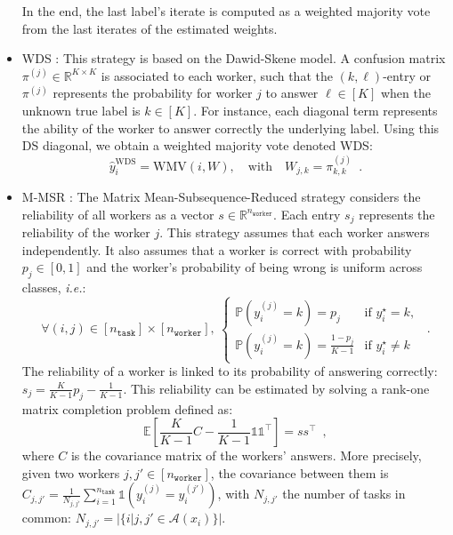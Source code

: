 \documentclass{cap2024}
\begin{document}
\begin{itemize}
    In the end, the last label's iterate is computed as a weighted majority vote from the last iterates of the estimated weights.

    \item WDS \citep{dawid_maximum_1979}:
    This strategy is based on the Dawid-Skene model. A confusion matrix $\pi^{(j)}\in\mathbb{R}^{K\times K}$ is associated to each worker, such that the $(k,\ell)$-entry or $\pi^{(j)}$ represents the probability for worker $j$ to answer $\ell\in[K]$ when the unknown true label is $k\in[K]$. For instance, each diagonal term represents the ability of the worker to answer correctly the underlying label.
  Using this DS diagonal, we obtain a weighted majority vote denoted WDS:
  \begin{equation}
    \hat{y}_i^\text{WDS}= \mathrm{WMV}\left(i, W\right),\quad
    \text{with}\quad W_{j,k} = \pi^{(j)}_{k,k}\enspace.
  \end{equation}
  \item M-MSR \citep{ma2020adversarial}: The Matrix Mean-Subsequence-Reduced strategy considers the reliability of all workers as a vector $s\in\mathbb{R}^{n_\texttt{worker}}$. Each entry $s_j$ represents the reliability of the worker $j$.
  This strategy assumes that each worker answers independently. It also assumes that a worker is correct with probability $p_j\in[0,1]$ and the worker's probability of being wrong is uniform across classes, \emph{i.e.}:
  \[\forall (i,j)\in [n_\texttt{task}]\times [n_\texttt{worker}],\ \begin{cases} \mathbb{P}(y_i^{(j)}=k)=p_j & \text{if } y_i^\star=k, \\ \mathbb{P}(y_i^{(j)}=k)=\frac{1-p_j}{K-1} & \text{if } y_i^\star\neq k\end{cases} \enspace.\]
  The reliability of a worker is linked to its probability of answering correctly: $s_j = \frac{K}{K-1}p_j - \frac{1}{K-1}$.
  This reliability can be estimated by solving a rank-one matrix completion problem defined as:
  \[\mathbb{E}\left[\frac{K}{K-1}C - \frac{1}{K-1}\mathds{1}\mathds{1}^\top\right]=ss^\top \enspace,\]
  where $C$ is the covariance matrix of the workers' answers.
  More precisely, given two workers $j,j' \in [n_\texttt{worker}]$, the covariance between them is $C_{j,j'} = \frac{1}{N_{j,j'}}\sum_{i=1}^{n_\texttt{task}} \mathds{1}(y_i^{(j)}=y_i^{(j')})$, with $N_{j,j'}$ the number of tasks in common: $N_{j,j'}=|\{i|j,j'\in\mathcal{A}(x_i)\}|$.


\end{itemize}
\end{document}

